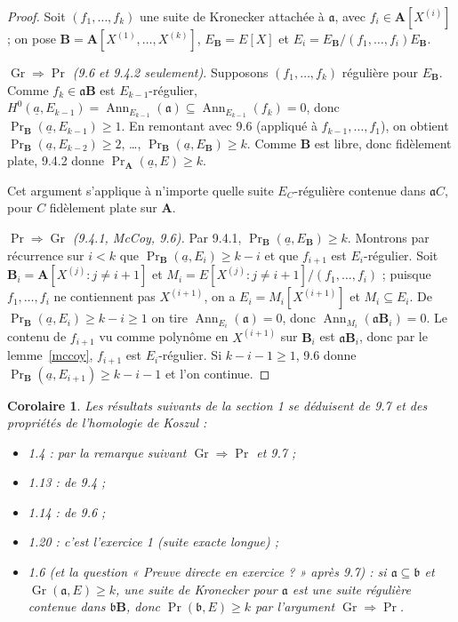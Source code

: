 \documentclass[11pt]{amsart}
\newtheorem{corollary}[theorem]{Corolaire}
\theoremstyle{definition}
\theoremstyle{remark}
\DeclareMathOperator{\Ann}{Ann}
\DeclareMathOperator{\Gr}{Gr}
\renewcommand{\Pr}{\operatorname{Pr}}
\newcommand{\A}{\mathbf{A}}
\newcommand{\B}{\mathbf{B}}
\newcommand{\ua}{\underline{a}}
\newcommand{\fa}{\mathfrak{a}}
\newcommand{\fb}{\mathfrak{b}}
\begin{document}
\begin{proof}
Soit $(f_1,\dots,f_k)$ une suite de Kronecker attachée à $\fa$, avec
$f_i\in\A[X^{(i)}]$ ; on pose $\B=\A[X^{(1)},\dots,X^{(k)}]$, $E_\B=E[X]$
et $E_i=E_\B/(f_1,\dots,f_i)E_\B$.

\smallskip\noindent\emph{$\Gr\Rightarrow\Pr$ (9.6 et 9.4.2 seulement).}
Supposons $(f_1,\dots,f_k)$ régulière pour $E_\B$. Comme
$f_k\in\fa\B$ est $E_{k-1}$-régulier,
$H^0(\ua,E_{k-1})=\Ann_{E_{k-1}}(\fa)\subseteq\Ann_{E_{k-1}}(f_k)=0$,
donc $\Pr_\B(\ua,E_{k-1})\ge1$. En remontant avec 9.6 (appliqué à
$f_{k-1},\dots,f_1$), on obtient $\Pr_\B(\ua,E_{k-2})\ge2$, \dots,
$\Pr_\B(\ua,E_\B)\ge k$. Comme $\B$ est libre, donc fidèlement plate,
9.4.2 donne $\Pr_\A(\ua,E)\ge k$.

Cet argument s'applique à n'importe quelle suite $E_C$-régulière contenue
dans $\fa C$, pour $C$ fidèlement plate sur $\A$.

\smallskip\noindent\emph{$\Pr\Rightarrow\Gr$ (9.4.1, McCoy, 9.6).}
Par 9.4.1, $\Pr_\B(\ua,E_\B)\ge k$. Montrons par récurrence sur $i<k$ que
$\Pr_\B(\ua,E_i)\ge k-i$ et que $f_{i+1}$ est $E_i$-régulier. Soit
$\B_i=\A[X^{(j)}:j\ne i+1]$ et
$M_i=E[X^{(j)}:j\neq i+1]/(f_1,\dots,f_i)$ ; puisque $f_1,\dots,f_i$ ne
contiennent pas $X^{(i+1)}$, on a $E_i=M_i[X^{(i+1)}]$ et
$M_i\subseteq E_i$. De $\Pr_\B(\ua,E_i)\ge k-i\ge1$ on tire
$\Ann_{E_i}(\fa)=0$, donc $\Ann_{M_i}(\fa\B_i)=0$. Le contenu de
$f_{i+1}$ vu comme polynôme en $X^{(i+1)}$ sur $\B_i$ est $\fa\B_i$, donc
par le lemme~\ref{mccoy}, $f_{i+1}$ est $E_i$-régulier. Si $k-i-1\ge1$,
9.6 donne $\Pr_\B(\ua,E_{i+1})\ge k-i-1$ et l'on continue.
\end{proof}

\begin{corollary}
Les résultats suivants de la section 1 se déduisent de 9.7 et des
propriétés de l'homologie de Koszul :
\begin{itemize}
\item 1.4 : par la remarque suivant $\Gr\Rightarrow\Pr$ et 9.7 ;
\item 1.13 : de 9.4 ;
\item 1.14 : de 9.6 ;
\item 1.20 : c'est l'exercice 1 (suite exacte longue) ;
\item 1.6 (et la question « Preuve directe en exercice ? » après 9.7) :
  si $\fa\subseteq\fb$ et $\Gr(\fa,E)\ge k$, une suite de Kronecker pour
  $\fa$ est une suite régulière contenue dans $\fb\B$, donc
  $\Pr(\fb,E)\ge k$ par l'argument $\Gr\Rightarrow\Pr$.
\end{itemize}
\end{corollary}
\end{document}
